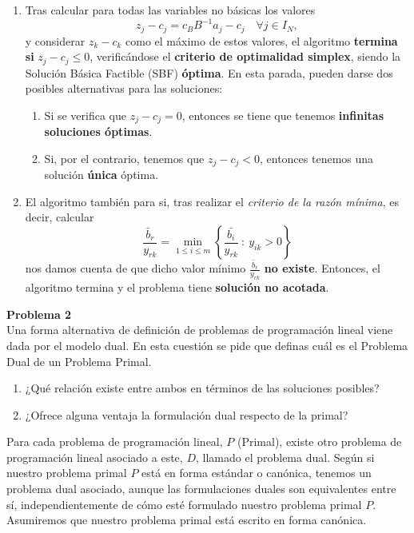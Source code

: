\documentclass[a4paper]{article}
\newenvironment{problem}[2][Problema]
    { \begin{mdframed}[backgroundcolor=gray!20] \textbf{#1 #2} \\}
    {  \end{mdframed}}
\begin{document}
\begin{enumerate}
\item Tras calcular para todas las variables no básicas los valores
\[
z_j - c_j = c_B B^{-1}a_j - c_j \quad \forall j \in I_N,
\]
y considerar \(z_k - c_k\) como el máximo de estos valores, el algoritmo \textbf{termina si} \(z_j - c_j \leq 0\), verificándose el \textbf{criterio de optimalidad simplex}, siendo la Solución Básica Factible (SBF) \textbf{óptima}. En esta parada, pueden darse dos posibles alternativas para las soluciones:
\begin{enumerate}
\item Si se verifica que \(z_j - c_j = 0\), entonces se tiene que tenemos \textbf{infinitas soluciones óptimas}.
\item Si, por el contrario, tenemos que \(z_j - c_j < 0\), entonces tenemos una solución \textbf{única} óptima.
\end{enumerate}

\item El algoritmo también para si, tras realizar el \emph{criterio de la razón mínima}, es decir, calcular
\[
\frac{\bar b_r}{y_{rk}} = \min_{1 \leq i \leq m} \left\{\frac{\bar{b_i}}{y_{rk}} \ : \ y_{ik} > 0\right\}  
\]
nos damos cuenta de que dicho valor mínimo \(\frac{\bar b_r}{y_{rk}} \) \textbf{no existe}. Entonces, el algoritmo termina y el problema tiene \textbf{solución no acotada}.
\end{enumerate}


\begin{problem}{2}
  Una forma alternativa de definición de problemas de programación lineal viene dada por el modelo dual. En esta cuestión se pide que definas cuál es el Problema Dual de un Problema Primal.
  \begin{enumerate}
\item ¿Qué relación existe entre ambos en términos de las soluciones posibles?
\item ¿Ofrece alguna ventaja la formulación dual respecto de la primal?
  \end{enumerate}
\end{problem}
\emph{}
Para cada problema de programación lineal, \(P\) (Primal), existe otro problema de programación lineal asociado a este, \(D\), llamado el problema dual. Según si nuestro problema primal \(P\) está en forma estándar o canónica, tenemos un problema dual asociado, aunque las formulaciones duales son equivalentes entre sí, independientemente de cómo esté formulado nuestro problema primal \(P\). Asumiremos que nuestro problema primal está escrito en forma canónica.\\
\end{document}

